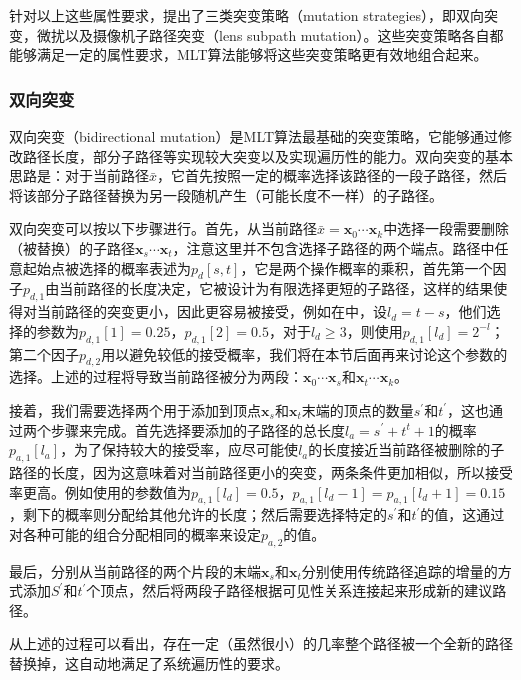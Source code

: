 针对以上这些属性要求，\cite{a:MetropolisLightTransport}提出了三类突变策略（mutation strategies），即双向突变，微扰以及摄像机子路径突变（lens subpath mutation）。这些突变策略各自都能够满足一定的属性要求，MLT算法能够将这些突变策略更有效地组合起来。




\subsubsection{双向突变}
双向突变（bidirectional mutation）是MLT算法最基础的突变策略，它能够通过修改路径长度，部分子路径等实现较大突变以及实现遍历性的能力。双向突变的基本思路是：对于当前路径$\bar{x}$，它首先按照一定的概率选择该路径的一段子路径，然后将该部分子路径替换为另一段随机产生（可能长度不一样）的子路径。

双向突变可以按以下步骤进行。首先，从当前路径$\bar{x}=\mathbf{x}_0\cdots\mathbf{x}_k$中选择一段需要删除（被替换）的子路径$\mathbf{x}_s\cdots\mathbf{x}_t$，注意这里并不包含选择子路径的两个端点。路径中任意起始点被选择的概率表述为$p_d[s,t]$，它是两个操作概率的乘积，首先第一个因子$p_{d,1}$由当前路径的长度决定，它被设计为有限选择更短的子路径，这样的结果使得对当前路径的突变更小，因此更容易被接受，例如在\cite{a:MetropolisLightTransport}中，设$l_d=t-s$，他们选择的参数为$p_{d,1}[1]=0.25$，$p_{d,1}[2]=0.5$，对于$l_d\geq 3$，则使用$p_{d,1}[l_d]=2^{-l}$；第二个因子$p_{d,2}$用以避免较低的接受概率，我们将在本节后面再来讨论这个参数的选择。上述的过程将导致当前路径被分为两段：$\mathbf{x}_0\cdots\mathbf{x}_s$和$\mathbf{x}_t\cdots\mathbf{x}_k$。

接着，我们需要选择两个用于添加到顶点$\mathbf{x}_s$和$\mathbf{x}_t$末端的顶点的数量$s^{'}$和$t^{'}$，这也通过两个步骤来完成。首先选择要添加的子路径的总长度$l_a=s^{'}+t^{t}+1$的概率$p_{a,1}[l_a]$，为了保持较大的接受率，应尽可能使$l_a$的长度接近当前路径被删除的子路径的长度，因为这意味着对当前路径更小的突变，两条条件更加相似，所以接受率更高。例如\cite{a:MetropolisLightTransport}使用的参数值为$p_{a,1}[l_d]=0.5$，$p_{a,1}[l_d-1]=p_{a,1}[l_d+1]=0.15$，剩下的概率则分配给其他允许的长度；然后需要选择特定的$s^{'}$和$t^{'}$的值，这通过对各种可能的组合分配相同的概率来设定$p_{a,2}$的值。

最后，分别从当前路径的两个片段的末端$\mathbf{x}_s$和$\mathbf{x}_t$分别使用传统路径追踪的增量的方式添加$S^{'}$和$t^{'}$个顶点，然后将两段子路径根据可见性关系连接起来形成新的建议路径。

从上述的过程可以看出，存在一定（虽然很小）的几率整个路径被一个全新的路径替换掉，这自动地满足了系统遍历性的要求。



